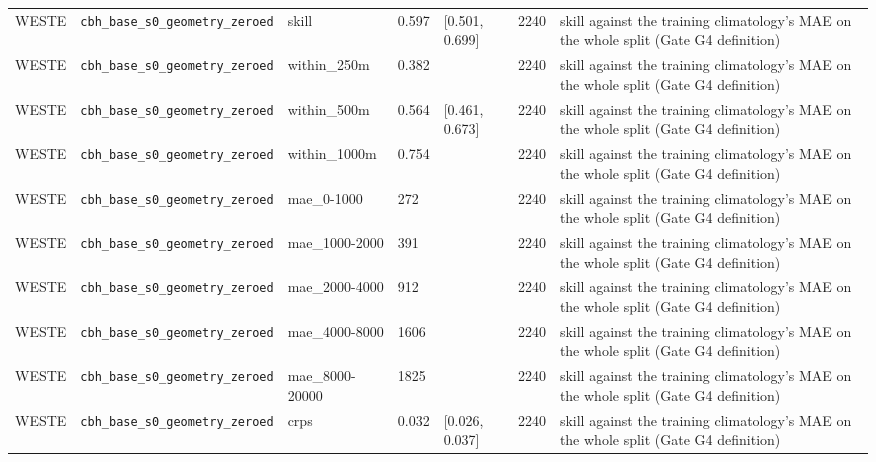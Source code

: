 \begin{center}
{\begin{tabular}{lp{2.4cm}llllp{7.3cm}}
WESTE & \texttt{cbh\_\allowbreak{}base\_\allowbreak{}s0\_\allowbreak{}geometry\_\allowbreak{}zeroed} & skill & 0.597 & [0.501, 0.699] & 2240 & skill against the training climatology's MAE on the whole split (Gate G4 definition) \\
WESTE & \texttt{cbh\_\allowbreak{}base\_\allowbreak{}s0\_\allowbreak{}geometry\_\allowbreak{}zeroed} & within\_250m & 0.382 &  & 2240 & skill against the training climatology's MAE on the whole split (Gate G4 definition) \\
WESTE & \texttt{cbh\_\allowbreak{}base\_\allowbreak{}s0\_\allowbreak{}geometry\_\allowbreak{}zeroed} & within\_500m & 0.564 & [0.461, 0.673] & 2240 & skill against the training climatology's MAE on the whole split (Gate G4 definition) \\
WESTE & \texttt{cbh\_\allowbreak{}base\_\allowbreak{}s0\_\allowbreak{}geometry\_\allowbreak{}zeroed} & within\_1000m & 0.754 &  & 2240 & skill against the training climatology's MAE on the whole split (Gate G4 definition) \\
WESTE & \texttt{cbh\_\allowbreak{}base\_\allowbreak{}s0\_\allowbreak{}geometry\_\allowbreak{}zeroed} & mae\_0-1000 & 272 &  & 2240 & skill against the training climatology's MAE on the whole split (Gate G4 definition) \\
WESTE & \texttt{cbh\_\allowbreak{}base\_\allowbreak{}s0\_\allowbreak{}geometry\_\allowbreak{}zeroed} & mae\_1000-2000 & 391 &  & 2240 & skill against the training climatology's MAE on the whole split (Gate G4 definition) \\
WESTE & \texttt{cbh\_\allowbreak{}base\_\allowbreak{}s0\_\allowbreak{}geometry\_\allowbreak{}zeroed} & mae\_2000-4000 & 912 &  & 2240 & skill against the training climatology's MAE on the whole split (Gate G4 definition) \\
WESTE & \texttt{cbh\_\allowbreak{}base\_\allowbreak{}s0\_\allowbreak{}geometry\_\allowbreak{}zeroed} & mae\_4000-8000 & 1606 &  & 2240 & skill against the training climatology's MAE on the whole split (Gate G4 definition) \\
WESTE & \texttt{cbh\_\allowbreak{}base\_\allowbreak{}s0\_\allowbreak{}geometry\_\allowbreak{}zeroed} & mae\_8000-20000 & 1825 &  & 2240 & skill against the training climatology's MAE on the whole split (Gate G4 definition) \\
WESTE & \texttt{cbh\_\allowbreak{}base\_\allowbreak{}s0\_\allowbreak{}geometry\_\allowbreak{}zeroed} & crps & 0.032 & [0.026, 0.037] & 2240 & skill against the training climatology's MAE on the whole split (Gate G4 definition) \\

\end{tabular}}
\end{center}
